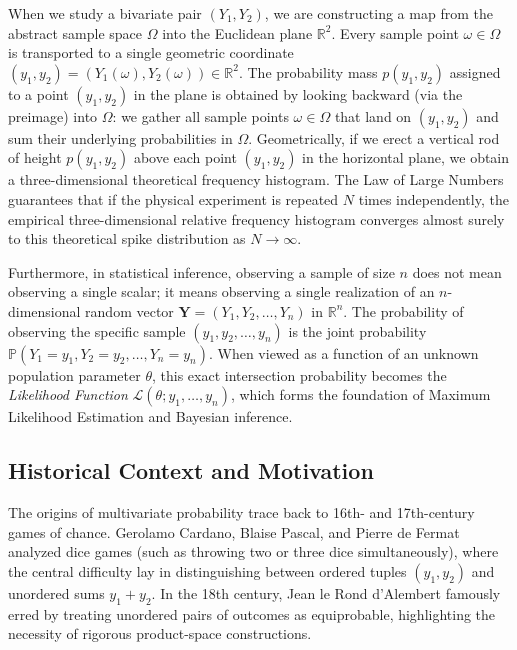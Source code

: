 \documentclass[11pt, letterpaper]{article}
\theoremstyle{definition}
\theoremstyle{remark}
\newcommand{\R}{\mathbb{R}}
\newcommand{\Prob}{\mathbb{P}}
\begin{document}
When we study a bivariate pair $(Y_1, Y_2)$, we are constructing a map from the abstract sample space $\Omega$ into the Euclidean plane $\R^2$. Every sample point $\omega \in \Omega$ is transported to a single geometric coordinate $(y_1, y_2) = (Y_1(\omega), Y_2(\omega)) \in \R^2$. The probability mass $p(y_1, y_2)$ assigned to a point $(y_1, y_2)$ in the plane is obtained by looking backward (via the preimage) into $\Omega$: we gather all sample points $\omega \in \Omega$ that land on $(y_1, y_2)$ and sum their underlying probabilities in $\Omega$. Geometrically, if we erect a vertical rod of height $p(y_1, y_2)$ above each point $(y_1, y_2)$ in the horizontal plane, we obtain a three-dimensional theoretical frequency histogram. The Law of Large Numbers guarantees that if the physical experiment is repeated $N$ times independently, the empirical three-dimensional relative frequency histogram converges almost surely to this theoretical spike distribution as $N \to \infty$.

Furthermore, in statistical inference, observing a sample of size $n$ does not mean observing a single scalar; it means observing a single realization of an $n$-dimensional random vector $\mathbf{Y} = (Y_1, Y_2, \dots, Y_n)$ in $\R^n$. The probability of observing the specific sample $(y_1, y_2, \dots, y_n)$ is the joint probability $\Prob(Y_1 = y_1, Y_2 = y_2, \dots, Y_n = y_n)$. When viewed as a function of an unknown population parameter $\theta$, this exact intersection probability becomes the \emph{Likelihood Function} $\mathcal{L}(\theta; y_1, \dots, y_n)$, which forms the foundation of Maximum Likelihood Estimation and Bayesian inference.

\subsection{Historical Context and Motivation}

The origins of multivariate probability trace back to 16th- and 17th-century games of chance. Gerolamo Cardano, Blaise Pascal, and Pierre de Fermat analyzed dice games (such as throwing two or three dice simultaneously), where the central difficulty lay in distinguishing between ordered tuples $(y_1, y_2)$ and unordered sums $y_1 + y_2$. In the 18th century, Jean le Rond d'Alembert famously erred by treating unordered pairs of outcomes as equiprobable, highlighting the necessity of rigorous product-space constructions.
\end{document}
